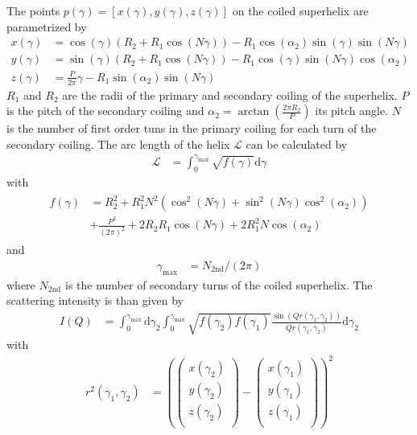 The points $p(\gamma)=\left[x(\gamma),y(\gamma),z(\gamma)\right]$ on the coiled superhelix are parametrized by
\begin{align}
x(\gamma) &= \cos\left(\gamma\right) \left(R_2+R_1\cos\left(N\gamma\right)\right)
            - R_1\cos\left(\alpha_2\right)\sin\left(\gamma\right)\sin\left(N\gamma\right) \\
y(\gamma) &= \sin\left(\gamma\right) \left(R_2+R_1\cos\left(N\gamma\right)\right)
            - R_1\cos\left(\gamma\right)\sin\left(N\gamma\right)\cos\left(\alpha_2\right) \\
z(\gamma) &= \frac{P}{2\pi}\gamma - R_1\sin\left(\alpha_2\right)\sin\left(N\gamma\right)
\end{align}
$R_1$ and $R_2$ are the radii of the primary and secondary coiling of the superhelix. $P$ is the pitch of the secondary coiling and $\alpha_2= \arctan\left(\frac{2\pi R_2}{P}\right)$ its pitch angle. $N$ is the number of first order tuns in the primary coiling for each turn of the secondary coiling.
The arc length of the helix $\mathcal{L}$ can be calculated by
\begin{align}
\mathcal{L} &= \int_0^{\gamma_\mathrm{max}} \sqrt{f(\gamma)} \mathrm{d}\gamma
\end{align}
with
\begin{align}
\begin{split}
f(\gamma) &= R_2^2+R_1^2N^2 \left(\cos^2\left(N\gamma\right)+\sin^2\left(N\gamma\right)\cos^2(\alpha_2)\right) \\
&+\frac{P^2}{(2\pi)^2} + 2R_2R_1\cos\left(N\gamma\right) +2R_1^2N\cos(\alpha_2)
\end{split}
\end{align}
and
\begin{align}
\gamma_\mathrm{max} &= N_\mathrm{2nd}/(2\pi)
\end{align}
where $N_\mathrm{2nd}$ is the number of secondary turns of the coiled superhelix.
The scattering intensity is than given by
\begin{align}
I(Q) &= \int_0^{\gamma_\mathrm{max}} \mathrm{d}\gamma_2 \int_0^{\gamma_\mathrm{max}} \sqrt{f(\gamma_2)f(\gamma_1)}
\frac{\sin\left( Qr(\gamma_1,\gamma_2)\right)}{Qr(\gamma_1,\gamma_2)} \mathrm{d}\gamma_2
\end{align}
with
\begin{align}
r^2(\gamma_1,\gamma_2) &= \left( \begin{pmatrix}
                            x(\gamma_2) \\
                            y(\gamma_2) \\
                            z(\gamma_2) \\
                          \end{pmatrix}
                        - \begin{pmatrix}
                            x(\gamma_1) \\
                            y(\gamma_1) \\
                            z(\gamma_1) \\
                          \end{pmatrix} \right)^2
\end{align}

